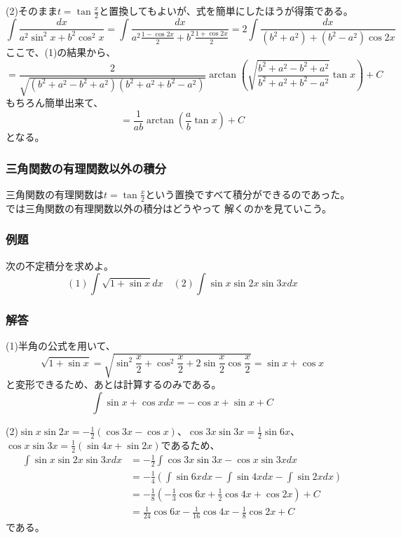 \documentclass[a4j,dvipdfmx]{jsarticle}
\begin{document}
(2)そのまま$t=\tan\frac{x}{2}$と置換してもよいが、式を簡単にしたほうが得策である。
\begin{equation*}
    \int \frac{dx}{a^2\sin^2 x+b^2\cos^2 x}=\int\frac{dx}{a^2\frac{1-\cos 2x}{2}+b^2\frac{1+\cos 2x}{2}}=2\int\frac{dx}{(b^2+a^2)+(b^2-a^2)\cos2x}
\end{equation*}
ここで、(1)の結果から、
\begin{equation*}
    =\frac{2}{\sqrt{(b^2+a^2-b^2+a^2)(b^2+a^2+b^2-a^2)}}\arctan\left(\sqrt{\frac{b^2+a^2-b^2+a^2}{b^2+a^2+b^2-a^2}}\tan x\right)+C
\end{equation*}
もちろん簡単出来て、
\begin{equation*}
    =\frac{1}{ab}\arctan\left(\frac{a}{b}\tan x\right)+C
\end{equation*}
となる。
\newpage
\subsubsection{三角関数の有理関数以外の積分}
三角関数の有理関数は$t=\tan \frac{x}{2}$という置換ですべて積分ができるのであった。では三角関数の有理関数以外の積分はどうやって
解くのかを見ていこう。

\subsubsection*{例題}
次の不定積分を求めよ。
\begin{equation*}
    (1)\int \sqrt{1+\sin x}dx\quad (2)\int \sin x\sin 2x\sin 3xdx
\end{equation*}
\subsubsection*{解答}
(1)半角の公式を用いて、
\begin{equation*}
    \sqrt{1+\sin x}=\sqrt{\sin^2\frac{x}{2}+\cos^2\frac{x}{2}+2\sin\frac{x}{2}\cos\frac{x}{2}}=\sin x+\cos x
\end{equation*}
と変形できるため、あとは計算するのみである。
\begin{equation*}
    \int \sin x+\cos x dx= -\cos x+\sin x+C
\end{equation*}

(2)$\sin x\sin 2x=-\frac{1}{2}(\cos 3x -\cos x)$、$\cos 3x\sin 3x=\frac{1}{2}\sin 6x$、$\cos x\sin 3x=\frac{1}{2}(\sin 4x+\sin 2x)$であるため、
\begin{align*}
    \int \sin x\sin 2x\sin 3xdx&=-\frac{1}{2}\int\cos 3x\sin 3x-\cos x\sin 3xdx\\
    &=-\frac{1}{4}(\int\sin 6xdx -\int\sin 4xdx-\int\sin 2xdx)\\
    &=-\frac{1}{8}(-\frac{1}{3}\cos 6x+\frac{1}{2}\cos 4x+\cos 2x)+C\\
    &=\frac{1}{24}\cos 6x-\frac{1}{16}\cos 4x-\frac{1}{8}\cos 2x+C
\end{align*}
である。
\newpage
\end{document}
